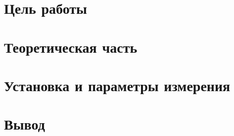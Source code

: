 \documentclass{letask}
\begin{document}


\section{Цель работы}

\section{Теоретическая часть}

\section{Установка и параметры измерения}

\section{Вывод}
\end{document}

